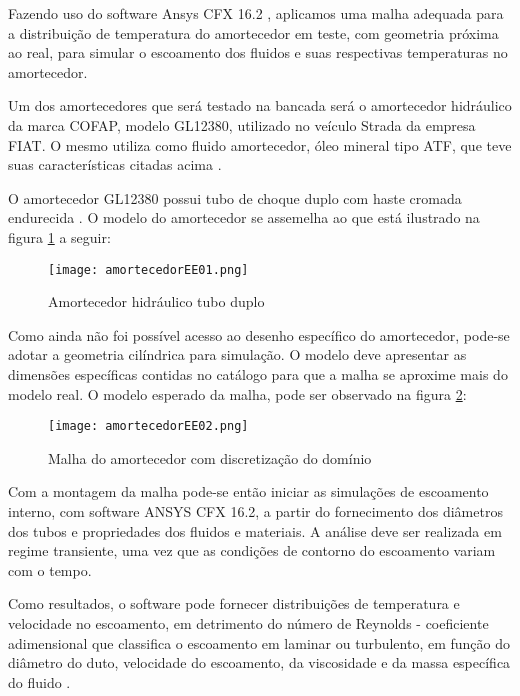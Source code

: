 	Fazendo uso do software Ansys CFX 16.2 , aplicamos uma malha adequada para a distribuição de temperatura do amortecedor em teste, com geometria próxima ao real, para simular o escoamento dos fluidos  e suas respectivas temperaturas no amortecedor.
	
	Um dos amortecedores que será testado na bancada será o amortecedor hidráulico da marca COFAP, modelo GL12380, utilizado no veículo Strada da empresa FIAT. O mesmo utiliza como fluido amortecedor, óleo mineral tipo ATF, que teve suas características citadas acima \cite{Cofap}.
	
	O amortecedor GL12380 possui tubo de choque duplo com haste cromada endurecida \cite{Cofap}. O modelo do amortecedor se assemelha ao que está ilustrado na figura \ref{amortecedorEE01} a seguir:

	\newpage
	\begin{figure}[!h]
		\centering
		\texttt{[image: amortecedorEE01.png]}
		\caption[Amortecedor hidráulico tubo duplo]{Amortecedor hidráulico tubo duplo \cite{Cofap}} 
		\label{amortecedorEE01}
	\end{figure}

	Como ainda não foi possível acesso ao desenho específico do amortecedor, pode-se adotar a geometria cilíndrica para simulação. O modelo deve apresentar as dimensões específicas contidas no catálogo para que a malha se aproxime mais do modelo real. O modelo esperado da malha, pode ser observado na figura \ref{amortecedorEE02}:

	\begin{figure}[!h]
		\centering
		\texttt{[image: amortecedorEE02.png]}
		\caption[Malha do amortecedor com discretização do domínio]{Malha do amortecedor com discretização do domínio \cite{Neto}}
		\label{amortecedorEE02}
	\end{figure}

	Com a montagem da malha pode-se então iniciar as simulações de escoamento interno, com software ANSYS CFX  16.2, a partir do fornecimento dos diâmetros dos tubos e propriedades dos fluidos e materiais. A análise deve ser realizada em regime transiente, uma vez que as condições de contorno do escoamento variam com o tempo.
	
	Como resultados, o software pode fornecer distribuições de temperatura e velocidade no escoamento, em detrimento do número de Reynolds - coeficiente adimensional que classifica o escoamento em laminar ou turbulento, em função do diâmetro do duto, velocidade do escoamento, da viscosidade e da massa específica do fluido \cite{Pariona}.
	
